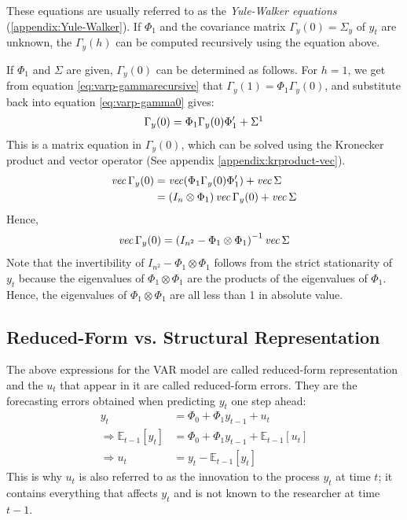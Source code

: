 These equations are usually referred to as the \textit{Yule-Walker equations} (\ref{appendix:Yule-Walker}).
If $\Phi_1$ and the covariance matrix $\Gamma_y(0) = \Sigma_y$ of $y_t$ are unknown, the $\Gamma_y(h)$ can be computed recursively using the equation above.

If $\Phi_1$ and $\Sigma$ are given, $\Gamma_y(0)$ can be determined as follows.
For $h=1$, we get from equation \ref{eq:varp-gammarecursive} that $\Gamma_y(1) = \Phi_1 \Gamma_y(0)$,
and substitute back into equation \ref{eq:varp-gamma0} gives:
\begin{gather*}
    \Gamma_y(0) = \Phi_1 \Gamma_y(0) \Phi_1^{\prime} + \Sigma \footnotemark
\end{gather*}
This is a matrix equation in $\Gamma_y(0)$, which can be solved using the Kronecker product and vector operator (See appendix \ref{appendix:krproduct-vec}).
\begin{align*}
    \operatorname{\mathit{vec}} \Gamma_y(0) &= \operatorname{\mathit{vec}} (\Phi_1 \Gamma_y(0) \Phi_1^{\prime}) + \operatorname{\mathit{vec}} \Sigma \\
                 &= \left(I_n \otimes \Phi_1\right) \operatorname{\mathit{vec}} \Gamma_y(0) + \operatorname{\mathit{vec}} \Sigma
\end{align*}
Hence,
\begin{gather*}
    \operatorname{\mathit{vec}} \Gamma_y(0) = \left(I_{n^2} - \Phi_1 \otimes \Phi_1\right)^{-1} \operatorname{\mathit{vec}} \Sigma
\end{gather*}
Note that the invertibility of $I_{n^2} - \Phi_1 \otimes \Phi_1$ follows from the strict stationarity of $y_t$
because the eigenvalues of $\Phi_1 \otimes \Phi_1$ are the products of the eigenvalues of $\Phi_1.$
Hence, the eigenvalues of $\Phi_1 \otimes \Phi_1$ are all less than 1 in absolute value.


\subsection{Reduced-Form vs. Structural Representation}
The above expressions for the VAR model are called reduced-form representation and the $u_t$ that appear in it are called reduced-form errors.
They are the forecasting errors obtained when predicting $y_t$ one step ahead:
\begin{align*}
    y_t &= \Phi_0 + \Phi_1 y_{t-1} + u_t \\
    \Rightarrow \mathbb{E}_{t-1} [y_t] &= \Phi_0 + \Phi_1 y_{t-1} + \mathbb{E}_{t-1} [u_t]\\
    \Rightarrow u_t &= y_t - \mathbb{E}_{t-1} [y_t]
\end{align*}
This is why $u_t$ is also referred to as the innovation to the process $y_t$ at time $t$;
it contains everything that affects $y_t$ and is not known to the researcher at time $t-1$.

